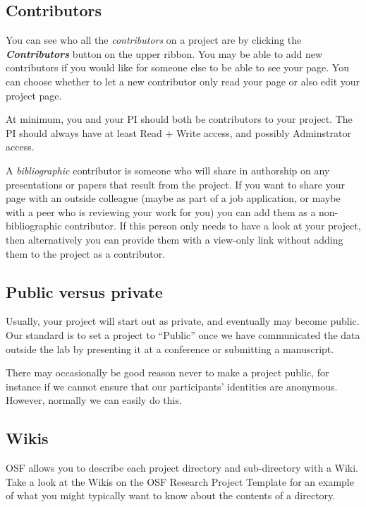 \documentclass[
  12pt,
]{book}
\begin{document}
\subsection{Contributors}\label{contributors}

You can see who all the \emph{contributors} on a project are by clicking the \textbf{\emph{Contributors}} button on the upper ribbon. You may be able to add new contributors if you would like for someone else to be able to see your page. You can choose whether to let a new contributor only read your page or also edit your project page.

At minimum, you and your PI should both be contributors to your project. The PI should always have at least Read + Write access, and possibly Adminstrator access.

A \emph{bibliographic} contributor is someone who will share in authorship on any presentations or papers that result from the project. If you want to share your page with an outside colleague (maybe as part of a job application, or maybe with a peer who is reviewing your work for you) you can add them as a non-bibliographic contributor. If this person only needs to have a look at your project, then alternatively you can provide them with a view-only link without adding them to the project as a contributor.

\subsection{Public versus private}\label{public-versus-private}

Usually, your project will start out as private, and eventually may become public. Our standard is to set a project to ``Public'' once we have communicated the data outside the lab by presenting it at a conference or submitting a manuscript.

There may occasionally be good reason never to make a project public, for instance if we cannot ensure that our participants' identities are anonymous. However, normally we can easily do this.

\subsection{Wikis}\label{wikis}

OSF allows you to describe each project directory and sub-directory with a Wiki. Take a look at the Wikis on the OSF Research Project Template for an example of what you might typically want to know about the contents of a directory.
\end{document}
